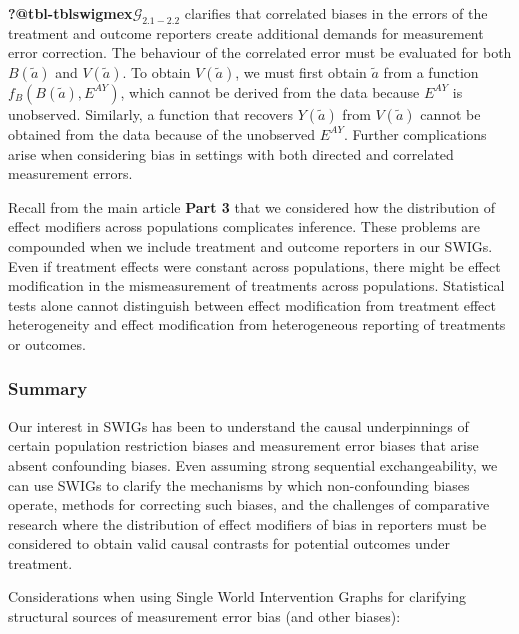 \documentclass[
  single column]{article}
\begin{document}
\textbf{?@tbl-tblswigmex}\(\mathcal{G}_{2.1-2.2}\) clarifies that
correlated biases in the errors of the treatment and outcome reporters
create additional demands for measurement error correction. The
behaviour of the correlated error must be evaluated for both
\(B(\tilde{a})\) and \(V(\tilde{a})\). To obtain \(V(\tilde{a})\), we
must first obtain \(\tilde{a}\) from a function
\(f_{B}(B(\tilde{a}), E^{AY})\), which cannot be derived from the data
because \(E^{AY}\) is unobserved. Similarly, a function that recovers
\(Y(\tilde{a})\) from \(V(\tilde{a})\) cannot be obtained from the data
because of the unobserved \(E^{AY}\). Further complications arise when
considering bias in settings with both directed and correlated
measurement errors.

Recall from the main article \textbf{Part 3} that we considered how the
distribution of effect modifiers across populations complicates
inference. These problems are compounded when we include treatment and
outcome reporters in our SWIGs. Even if treatment effects were constant
across populations, there might be effect modification in the
mismeasurement of treatments across populations. Statistical tests alone
cannot distinguish between effect modification from treatment effect
heterogeneity and effect modification from heterogeneous reporting of
treatments or outcomes.

\subsubsection{Summary}\label{summary}

Our interest in SWIGs has been to understand the causal underpinnings of
certain population restriction biases and measurement error biases that
arise absent confounding biases. Even assuming strong sequential
exchangeability, we can use SWIGs to clarify the mechanisms by which
non-confounding biases operate, methods for correcting such biases, and
the challenges of comparative research where the distribution of effect
modifiers of bias in reporters must be considered to obtain valid causal
contrasts for potential outcomes under treatment.

Considerations when using Single World Intervention Graphs for
clarifying structural sources of measurement error bias (and other
biases):
\end{document}
